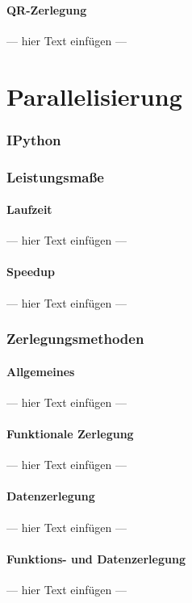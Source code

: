 \documentclass[a4paper, 12pt]{article}
\begin{document}
\subsection{QR-Zerlegung}
--- hier Text einfügen ---




\part{Parallelisierung}



\section{IPython}



\section{Leistungsmaße}


\subsection{Laufzeit}
--- hier Text einfügen ---


\subsection{Speedup}
--- hier Text einfügen ---



\section{Zerlegungsmethoden}


\subsection{Allgemeines}
--- hier Text einfügen ---


\subsection{Funktionale Zerlegung}
--- hier Text einfügen ---


\subsection{Datenzerlegung}
--- hier Text einfügen ---


\subsection{Funktions- und Datenzerlegung}
--- hier Text einfügen ---
\end{document}
